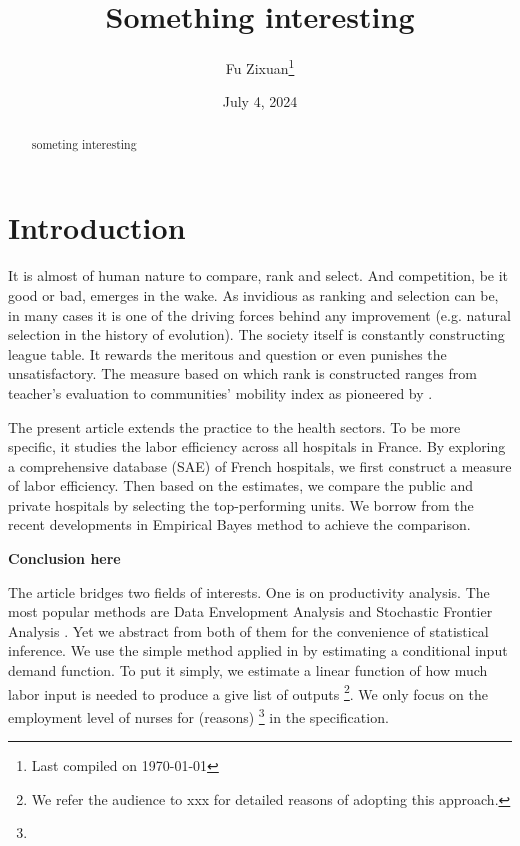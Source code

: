 \documentclass[12pt]{article}
\title{Something interesting}
\author{Fu Zixuan\thanks{Last compiled on \today}}
\date{July 4, 2024}
\begin{document}
\maketitle

\begin{abstract}
    \noindent  someting interesting\\


    \bigskip
\end{abstract}

\newpage
\tableofcontents
\newpage

\section{Introduction}

It is almost of human nature to compare, rank and select. And competition, be
it good or bad, emerges in the wake. As invidious as ranking and selection can
be, in many cases it is one of the driving forces behind any improvement (e.g.
natural selection in the history of evolution). The society itself is
constantly constructing league table. It rewards the meritous and question or
even punishes the unsatisfactory. The measure based on which rank is
constructed ranges from teacher's evaluation to communities' mobility index as
pioneered by \cite{}.

The present article extends the practice to the health sectors. To be more
specific, it studies the labor efficiency across all hospitals in France. By
exploring a comprehensive database (SAE) of French hospitals, we first
construct a measure of labor efficiency. Then based on the estimates, we
compare the public and private hospitals by selecting the top-performing units.
We borrow from the recent developments in Empirical Bayes method to achieve the
comparison.

\textbf{Conclusion here}

The article bridges two fields of interests. One is on productivity analysis.
The most popular methods are Data Envelopment Analysis \cite{} and Stochastic
Frontier Analysis \cite{}. Yet we abstract from both of them for the
convenience of statistical inference. We use the simple method applied in
\cite{CroisetGarybobo_2024} by estimating a conditional input demand function.
To put it simply, we estimate a linear function of how much labor input is
needed to produce a give list of outputs \footnote{We refer the audience to xxx
    for detailed reasons of adopting this approach.}. We only focus on the
employment level of nurses for (reasons) \footnote{} in the specification.
\end{document}
